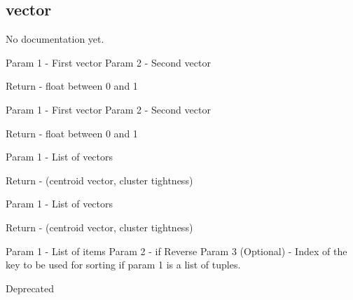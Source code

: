 \subsection{vector}
\par
No documentation yet.
{Param 1 - First vector
Param 2 - Second vector

Return - float between 0 and 1}
{Param 1 - First vector
Param 2 - Second vector

Return - float between 0 and 1}
{Param 1 - List of vectors

Return - (centroid vector, cluster tightness)}
{Param 1 - List of vectors

Return - (centroid vector, cluster tightness)}
{Param 1 - List of items
Param 2 - if Reverse
Param 3 (Optional) - Index of the key to be used for sorting
if param 1 is a list of tuples.

Deprecated}
